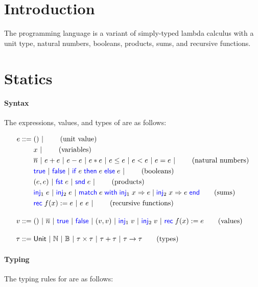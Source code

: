 \documentclass[10pt]{scrartcl}
\begin{document}
\author{Amin Timany}
\title{\simplelang{}}

\maketitle

\section{Introduction}
\label{sec:intro}
The programming language \simplelang{} is a variant of simply-typed lambda calculus with a unit type, natural numbers, booleans, products, sums, and recursive functions.

\section{Statics}
\label{sec:statics}

\paragraph{Syntax}
The expressions, values, and types of \simplelang{} are as follows:

\begin{align*}
  \expr \BNFdef{}
  & \TT \ALT \tag{unit value} \\
  & \var \ALT \tag{variables} \\
  & \Num{n} \ALT \expr + \expr \ALT \expr - \expr \ALT \expr * \expr \ALT \expr \le \expr \ALT \expr < \expr \ALT \expr = \expr \ALT \tag{natural numbers}\\
  & \True \ALT \False \ALT \If \expr then \expr\; \Else \expr \ALT \tag{booleans} \\
  & (\expr, \expr) \ALT \Fst \expr \ALT \Snd \expr \ALT \tag{products} \\
  & \Inj{1} \expr \ALT \Inj{2} \expr \ALT \Match \expr with \Inj{1} \var => \expr | \Inj{2} \var => \expr end \tag{sums}\\
  & \Rec f \var := \expr \ALT \expr~\expr \ALT \tag{recursive functions}\\[1em]
  \val \BNFdef{}
  & \TT \ALT \Num{n} \ALT \True \ALT \False \ALT (\val, \val) \ALT \Inj{1} \val \ALT \Inj{2} \val \ALT \Rec f \var := \expr \tag{values}\\[1em]
  \typ \BNFdef{}
  & \Tunit \ALT \Tnat \ALT \Tbool \ALT \typ \times \typ \ALT \typ + \typ \ALT \typ \to \typ \tag{types}
\end{align*}

\paragraph{Typing}
The typing rules for \simplelang{} are as follows:
\end{document}

